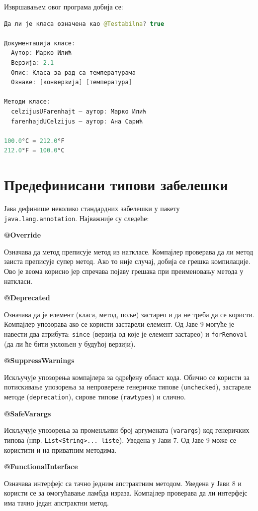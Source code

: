 Извршавањем овог програма добија се:

\begin{lstlisting}[language=Java]
Да ли је класа означена као @Testabilna? true
 
Документација класе:
  Аутор: Марко Илић
  Верзија: 2.1
  Опис: Класа за рад са температурама
  Ознаке: [конверзија] [температура]
 
Методи класе:
  celzijusUFarenhajt – аутор: Марко Илић
  farenhajdUCelzijus – аутор: Ана Сарић
 
100.0°C = 212.0°F
212.0°F = 100.0°C
\end{lstlisting}

\section{Предефинисани типови забелешки}

Јава дефинише неколико стандардних забелешки у пакету \texttt{java.lang.annotation}. Најважније су следеће:


\textbf{@Override}

Означава да метод преписује метод из наткласе. Компајлер проверава да ли метод заиста преписује супер метод. Ако то није случај, добија се грешка компилације. Ово је веома корисно јер спречава појаву грешака при преименовању метода у наткласи.


\textbf{@Deprecated}

Означава да је елемент (класа, метод, поље) застарео и да не треба да се користи. Компајлер упозорава ако се користи застарели елемент. Од Јаве 9 могуће је навести два атрибута: \texttt{since} (верзија од које је елемент застарео) и \texttt{forRemoval} (да ли ће бити уклоњен у будућој верзији).


\textbf{@SuppressWarnings}

Искључује упозорења компајлера за одређену област кода. Обично се користи за потискивање упозорења за непроверене генеричке типове (\texttt{unchecked}), застареле методе (\texttt{deprecation}), сирове типове (\texttt{rawtypes}) и слично.


\textbf{@SafeVarargs}

Искључује упозорења за променљиви број аргумената (\texttt{varargs}) код генеричких типова (нпр. \texttt{List\textless{}String\textgreater{}... liste}). Уведена у Јави 7. Од Јаве 9 може се користити и на приватним методима.


\textbf{@FunctionalInterface}

Означава интерфејс са тачно једним апстрактним методом. Уведена у Јави 8 и користи се за омогућавање ламбда израза. Компајлер проверава да ли интерфејс има тачно један апстрактни метод.


